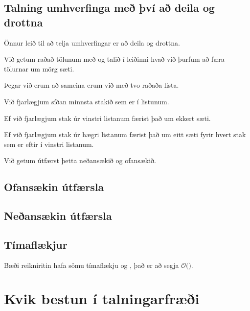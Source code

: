 \subsection{Talning umhverfinga með því að deila og drottna}
{
    {
        \item<1-> Önnur leið til að telja umhverfingar er að deila og drottna.
        \item<2-> Við getum raðað tölunum með  og talið í leiðinni hvað við þurfum að færa tölurnar um mörg sæti.
        \item<3-> Þegar við erum að sameina erum við með tvo raðaða lista.
        \item<4-> Við fjarlægjum síðan minnsta stakið sem er í listunum.
        \item<5-> Ef við fjarlægjum stak úr vinstri listanum færist það um ekkert sæti.
        \item<6-> Ef við fjarlægjum stak úr hægri listanum færist það um eitt sæti fyrir hvert stak sem er eftir í vinstri listanum.
        \item<7-> Við getum útfærst þetta neðansækið og ofansækið.
    }
}

\subsection{Ofansækin útfærsla}
{
}

\subsection{Neðansækin útfærsla}
{
}

\subsection{Tímaflækjur}
{
    {
        \item<1-> Bæði reikniritin hafa sömu tímaflækju og , það er að segja $\mathcal{O}($$)$.
    }
}

\section{Kvik bestun í talningarfræði}
